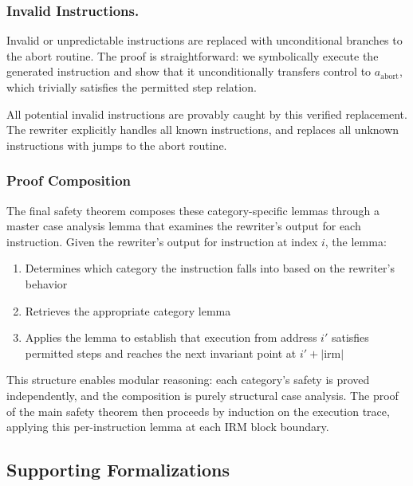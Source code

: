 \subsubsection{Invalid Instructions.}

Invalid or unpredictable instructions are replaced with unconditional branches to the abort routine.
The proof is straightforward: we symbolically execute the generated instruction and show that it unconditionally transfers control to $a_{\text{abort}}$, which trivially satisfies the permitted step relation.

All potential invalid instructions are provably caught by this verified replacement.
The rewriter explicitly handles all known instructions, and replaces all unknown instructions with jumps to the abort routine.

\subsubsection{Proof Composition}

The final safety theorem composes these category-specific lemmas through a master case analysis lemma that examines the rewriter's output for each instruction.
Given the rewriter's output for instruction at index $i$, the lemma:

\begin{enumerate}
    \item Determines which category the instruction falls into based on the rewriter's behavior
    \item Retrieves the appropriate category lemma
    \item Applies the lemma to establish that execution from address $i'$ satisfies permitted steps and reaches the next invariant point at $i' + |\mathrm{irm}|$
\end{enumerate}

This structure enables modular reasoning: each category's safety is proved independently, and the composition is purely structural case analysis.
The proof of the main safety theorem then proceeds by induction on the execution trace, applying this per-instruction lemma at each IRM block boundary.

\subsection{Supporting Formalizations}


